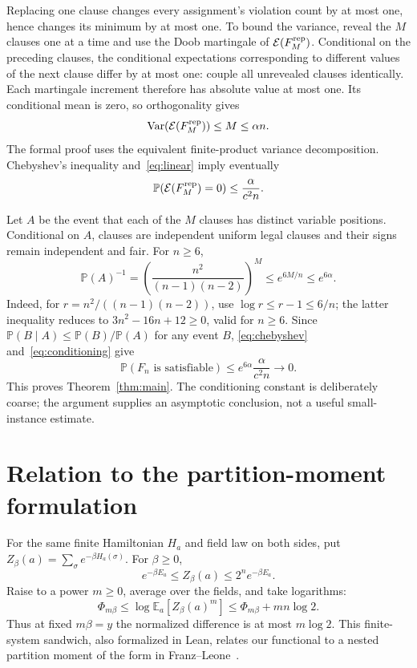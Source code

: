 \documentclass[11pt]{article}
\theoremstyle{remark}
\newcommand{\E}{\mathbb{E}}
\newcommand{\Prob}{\mathbb{P}}
\newcommand{\Var}{\operatorname{Var}}
\newcommand{\en}{\mathcal{E}}
\begin{document}
Replacing one clause changes every assignment's violation count by at
most one, hence changes its minimum by at most one. To bound the variance,
reveal the $M$ clauses one at a time and use the Doob martingale of
$\en(F^{\rm rep}_M)$. Conditional on the preceding clauses, the
conditional expectations corresponding to different values of the next
clause differ by at most one: couple all unrevealed clauses identically.
Each martingale increment therefore has absolute value at most one.
Its conditional mean is zero, so orthogonality gives
\begin{equation}\label{eq:variance}
 \Var(\en(F^{\rm rep}_M))\leq M\leq\alpha n.
\end{equation}
The formal proof uses the equivalent finite-product variance decomposition.
Chebyshev's inequality and~\eqref{eq:linear} imply eventually
\begin{equation}\label{eq:chebyshev}
 \Prob(\en(F^{\rm rep}_M)=0)\leq\frac{\alpha}{c^2n}.
\end{equation}

Let $A$ be the event that each of the $M$ clauses has distinct variable
positions. Conditional on $A$, clauses are independent uniform legal
clauses and their signs remain independent and fair. For $n\geq6$,
\begin{equation}\label{eq:conditioning}
 \Prob(A)^{-1}=
 \left(\frac{n^2}{(n-1)(n-2)}\right)^M
 \leq e^{6M/n}\leq e^{6\alpha}.
\end{equation}
Indeed, for $r=n^2/((n-1)(n-2))$, use
$\log r\leq r-1\leq6/n$; the latter inequality reduces to
$3n^2-16n+12\geq0$, valid for $n\geq6$.
Since $\Prob(B\mid A)\leq\Prob(B)/\Prob(A)$ for any event $B$,
\eqref{eq:chebyshev} and~\eqref{eq:conditioning} give
\[
 \Prob(F_n\text{ is satisfiable})
 \leq e^{6\alpha}\frac{\alpha}{c^2n}\longrightarrow0.
\]
This proves Theorem~\ref{thm:main}. The conditioning constant is deliberately
coarse; the argument supplies an asymptotic conclusion, not a useful
small-instance estimate.

\section{Relation to the partition-moment formulation}
For the same finite Hamiltonian $H_a$ and field law on both sides, put
$Z_\beta(a)=\sum_\sigma e^{-\beta H_a(\sigma)}$. For $\beta\geq0$,
\[
 e^{-\beta E_a}\leq Z_\beta(a)\leq2^n e^{-\beta E_a}.
\]
Raise to a power $m\geq0$, average over the fields, and take logarithms:
\begin{equation}\label{eq:bridge}
 \Phi_{m\beta}\leq\log\E_a[Z_\beta(a)^m]
                  \leq\Phi_{m\beta}+mn\log2.
\end{equation}
Thus at fixed $m\beta=y$ the normalized difference is at most $m\log2$.
This finite-system sandwich, also formalized in Lean, relates our
functional to a nested partition moment of the form in
Franz--Leone~\cite[equation (45)]{FL}.
\end{document}
